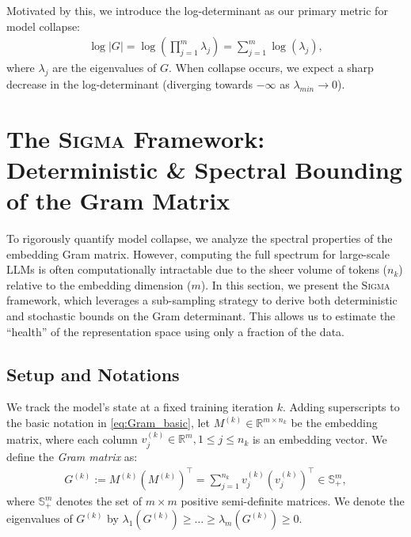 \documentclass{article}
\theoremstyle{plain}
\theoremstyle{definition}
\theoremstyle{remark}
\newcommand{\sgma}{\textsc{Sigma}\xspace}
\begin{document}
Motivated by this, we introduce the log-determinant as our primary metric for model collapse: 
\begin{align} \label{eq:Gram_basic}
    \log |G| = \log \left(\prod_{j=1}^m \lambda_j\right) = \sum_{j=1}^{m} \log (\lambda_j),
\end{align}
where $\lambda_j$ are the eigenvalues of $G$. When collapse occurs, we expect a sharp decrease in the log-determinant (diverging towards $-\infty$ as $\lambda_{min} \to 0$). 

\section{The \sgma Framework: Deterministic \& Spectral Bounding of the Gram Matrix}
\label{sec:method4}
To rigorously quantify model collapse, we analyze the spectral properties of the embedding Gram matrix. However, computing the full spectrum for large-scale LLMs is often computationally intractable due to the sheer volume of tokens ($n_k$) relative to the embedding dimension ($m$). In this section, we present the \sgma framework, which leverages a sub-sampling strategy to derive both deterministic and stochastic bounds on the Gram determinant. This allows us to estimate the ``health'' of the representation space using only a fraction of the data.

\subsection{Setup and Notations}
\label{sec:method4:setup}
We track the model's state at a fixed training iteration $k$. Adding superscripts to the basic notation in \eqref{eq:Gram_basic}, let $M^{(k)} \in \mathbb{R}^{m \times n_k}$ be the embedding matrix, where each column $v^{(k)}_j \in \mathbb{R}^m, 1 \leq j \leq n_k$ is an embedding vector. We define the \emph{Gram matrix} as:
\begin{align}
    G^{(k)}:=M^{(k)} \left(M^{(k)}\right)^{\!\top} = \sum_{j=1}^{n_k} v^{(k)}_j \left(v^{(k)}_j\right)^{\!\top}\in \mathbb{S}^m_{+},
\end{align}
where $\mathbb{S}^m_{+}$ denotes the set of $m \times m$ positive semi-definite matrices. We denote the eigenvalues of $G^{(k)}$ by $\lambda_1(G^{(k)}) \ge \dots \ge \lambda_m(G^{(k)}) \ge 0$.
\end{document}

